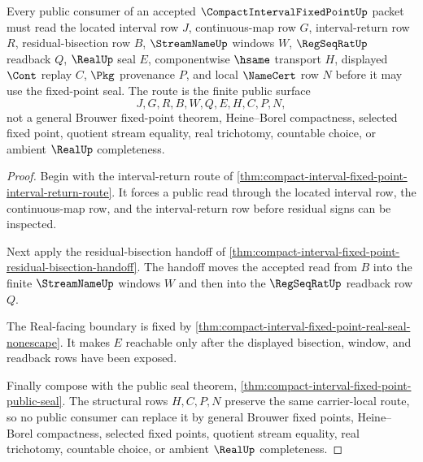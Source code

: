 \begin{theorem}
\label{thm:compact-interval-fixed-point-public-consumer-route}
Every public consumer of an accepted $\CompactIntervalFixedPointUp$ packet must read the located interval row $J$, continuous-map row $G$, interval-return row $R$, residual-bisection row $B$, $\StreamNameUp$ windows $W$, $\RegSeqRatUp$ readback $Q$, $\RealUp$ seal $E$, componentwise $\hsame$ transport $H$, displayed $\Cont$ replay $C$, $\Pkg$ provenance $P$, and local $\NameCert$ row $N$ before it may use the fixed-point seal. The route is the finite public surface
$$
J,G,R,B,W,Q,E,H,C,P,N ,
$$
not a general Brouwer fixed-point theorem, Heine--Borel compactness, selected fixed point, quotient stream equality, real trichotomy, countable choice, or ambient $\RealUp$ completeness.
\end{theorem}
\begin{proof}
Begin with the interval-return route of \autoref{thm:compact-interval-fixed-point-interval-return-route}. It forces a public read through the located interval row, the continuous-map row, and the interval-return row before residual signs can be inspected.

Next apply the residual-bisection handoff of \autoref{thm:compact-interval-fixed-point-residual-bisection-handoff}. The handoff moves the accepted read from $B$ into the finite $\StreamNameUp$ windows $W$ and then into the $\RegSeqRatUp$ readback row $Q$.

The Real-facing boundary is fixed by \autoref{thm:compact-interval-fixed-point-real-seal-nonescape}. It makes $E$ reachable only after the displayed bisection, window, and readback rows have been exposed.

Finally compose with the public seal theorem, \autoref{thm:compact-interval-fixed-point-public-seal}. The structural rows $H,C,P,N$ preserve the same carrier-local route, so no public consumer can replace it by general Brouwer fixed points, Heine--Borel compactness, selected fixed points, quotient stream equality, real trichotomy, countable choice, or ambient $\RealUp$ completeness.
\end{proof}


